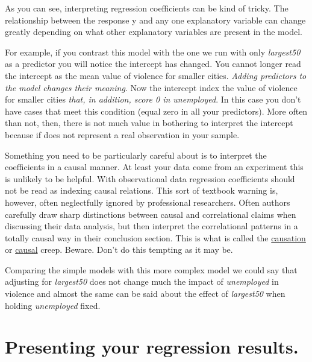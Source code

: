 \documentclass[
]{book}
\begin{document}
As you can see, interpreting regression coefficients can be kind of tricky. The relationship between the response y and any one explanatory variable can change greatly depending on what other explanatory variables are present in the model.

For example, if you contrast this model with the one we run with only \emph{largest50} as a predictor you will notice the intercept has changed. You cannot longer read the intercept as the mean value of violence for smaller cities. \emph{Adding predictors to the model changes their meaning}. Now the intercept index the value of violence for smaller cities \emph{that, in addition, score 0 in unemployed}. In this case you don't have cases that meet this condition (equal zero in all your predictors). More often than not, then, there is not much value in bothering to interpret the intercept because if does not represent a real observation in your sample.

Something you need to be particularly careful about is to interpret the coefficients in a causal manner. At least your data come from an experiment this is unlikely to be helpful. With observational data regression coefficients should not be read as indexing causal relations. This sort of textbook warning is, however, often neglectfully ignored by professional researchers. Often authors carefully draw sharp distinctions between causal and correlational claims when discussing their data analysis, but then interpret the correlational patterns in a totally causal way in their conclusion section. This is what is called the \href{http://junkcharts.typepad.com/numbersruleyourworld/2012/07/the-causation-creep.html}{causation} or \href{http://www.carlislerainey.com/2012/12/05/another-example-of-causal-creep/}{causal} creep. Beware. Don't do this tempting as it may be.

Comparing the simple models with this more complex model we could say that adjusting for \emph{largest50} does not change much the impact of \emph{unemployed} in violence and almost the same can be said about the effect of \emph{largest50} when holding \emph{unemployed} fixed.

\hypertarget{presenting-your-regression-results.}{%
\section{Presenting your regression results.}\label{presenting-your-regression-results.}}
\end{document}
